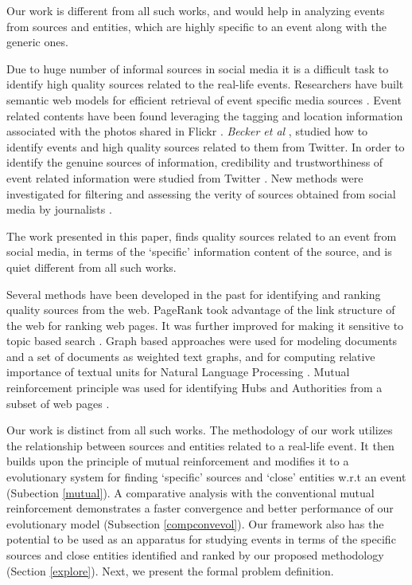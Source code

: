 Our work is different from all such works, and would help in analyzing events from sources and entities, which are highly specific to an event along with the generic ones.

Due to huge number of informal sources in social media it is a difficult task to identify high quality sources related to the real-life events. Researchers have built semantic web models for efficient retrieval of event specific media sources \cite{troncy2010linking}. Event related contents have been found leveraging the tagging and location information associated with the photos shared in Flickr \cite{rattenbury2007towards}. \textit{Becker et al} \cite{becker2011selecting}, studied how to identify events and high quality sources related to them from Twitter. In order to identify the genuine sources of information, credibility and trustworthiness of event related information were studied from Twitter \cite{gupta2012evaluating}. New methods were investigated for filtering and assessing the verity of sources obtained from social media by journalists \cite{diakopoulos2012finding}. 

The work presented in this paper, finds quality sources related to an event from social media, in terms of the `specific' information content of the source, and is quiet different from all such works.

Several methods have been developed in the past for identifying and ranking quality sources from the web. PageRank \cite{brin1998anatomy} took advantage of the link structure of the web for ranking web pages. It was further improved for making it sensitive to topic based search \cite{haveliwala2003topic}. Graph based approaches were used for modeling documents and a set of documents as weighted text graphs, and for computing relative importance of textual units for Natural Language Processing \cite{erkan2004lexrank}. Mutual reinforcement principle was used for identifying Hubs and Authorities from a subset of web pages \cite{kleinberg1999authoritative}. 

Our work is distinct from all such works. The methodology of our work utilizes the relationship between sources and entities related to a real-life event. It then builds upon the principle of mutual reinforcement and modifies it to a evolutionary system for finding `specific' sources and `close' entities w.r.t an event (Subection \ref{mutual}). A comparative analysis with the conventional mutual reinforcement demonstrates a faster convergence and better performance of our evolutionary model (Subsection \ref{compconvevol}). Our framework also has the potential to be used as an apparatus for studying events in terms of the specific sources and close entities identified and ranked by our proposed methodology (Section \ref{explore}). Next, we present the formal problem definition.




